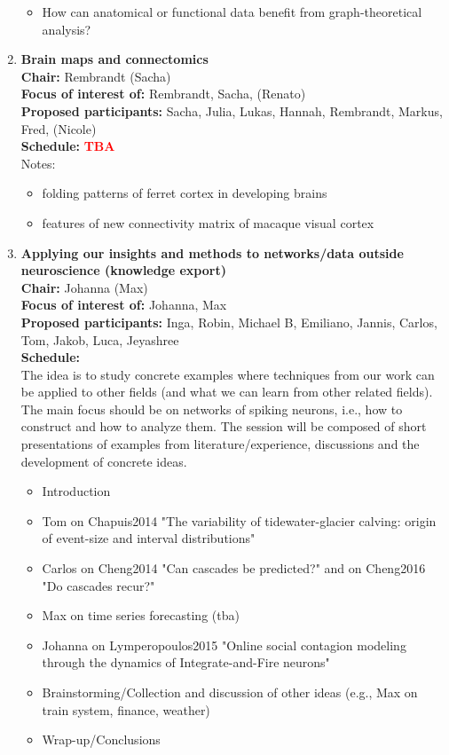 \documentclass[10pt, a4paper,twoside,american]{article}
\newcommand{\alert}[1]{\textcolor{red}{\bf #1}}
\begin{document}
\begin{enumerate}[resume]
\begin{itemize}
  \item How can anatomical or functional data benefit from graph-theoretical analysis?
  \end{itemize}
\item {\large\bf Brain maps and connectomics}\\[1ex]
  {\bf Chair:} Rembrandt (Sacha)\\[1ex]
  {\bf Focus of interest of:} Rembrandt, Sacha, (Renato)\\[1ex]
  {\bf Proposed participants:} Sacha, Julia, Lukas, Hannah, Rembrandt, Markus, Fred, (Nicole)\\[1ex]
  {\bf Schedule:} \alert{TBA}\\[1ex]
  Notes:
  \begin{itemize}
  \item folding patterns of ferret cortex in developing brains
  \item features of new connectivity matrix of macaque visual cortex
  \end{itemize}
\item {\large\bf Applying our insights and methods to networks/data outside neuroscience (knowledge export)}\\[1ex]
  {\bf Chair:} Johanna (Max)\\[1ex]
  {\bf Focus of interest of:} Johanna, Max\\[1ex]
  {\bf Proposed participants:} Inga, Robin, Michael B, Emiliano, Jannis, Carlos, Tom, Jakob, Luca, Jeyashree\\[1ex]
  	{\bf Schedule:}\\[1ex]
	The idea is to study concrete examples where techniques from our
	work can be applied to other fields (and what we can learn from other
	related fields). The main focus should be on networks of spiking
	neurons, i.e., how to construct and how to analyze them.  The
	session will be composed of short presentations of examples 		from literature/experience, discussions and the development of concrete ideas.\\	
  	\begin{itemize}
  	\item Introduction
  	\item Tom on Chapuis2014 "The variability of tidewater-glacier calving: origin of event-size and interval distributions"
  	\item Carlos on Cheng2014 "Can cascades be predicted?" and on Cheng2016 "Do cascades recur?"
  	\item Max on time series forecasting (tba)
  	\item Johanna on Lymperopoulos2015 "Online social contagion modeling through the dynamics of Integrate-and-Fire neurons"
  	\item Brainstorming/Collection and discussion of other ideas (e.g., Max on train system, finance, weather)
  	\item Wrap-up/Conclusions
  \end{itemize}
\end{enumerate}
\end{document}
